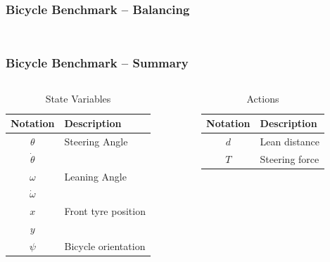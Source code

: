 \begin{frame}[label=bicycle_balance]
    \frametitle{Bicycle Benchmark -- Balancing}

    \vfill
    \begin{columns}
        \begin{column}{0.45\textwidth}
            \centering
            
        \end{column}
        \begin{column}{0.55\textwidth}
            \centering
             {
            }
        \end{column}
    \end{columns}
\end{frame}

\begin{frame}[label=bicycle_summary]
    \frametitle{Bicycle Benchmark -- Summary}

    \centering
    \begin{columns}[t]
        \begin{column}{.4\textwidth}
            \begin{table}
                \caption{State Variables}
                \begin{tabularx}{\textwidth}{cX}
                    \toprule
                    Notation & Description \\
                    \midrule
                    $\theta$ & Steering Angle \\
                    $\dot{\theta}$ &  \\
                    $\omega$ & Leaning Angle \\
                    $\dot{\omega}$ &  \\
                    $x$ & Front tyre position \\
                    $y$ &  \\
                    $\psi$ & Bicycle orientation \\
                    \bottomrule
                \end{tabularx}
            \end{table}
        \end{column}
        \begin{column}{.4\textwidth}
            \begin{table}
                \caption{Actions}
                \begin{tabularx}{\textwidth}{cX}
                    \toprule
                    Notation & Description \\
                    \midrule
                    $d$ & Lean distance \\
                    $T$ & Steering force \\
                    \bottomrule
                \end{tabularx}
            \end{table}
        \end{column}
    \end{columns}
\end{frame}

